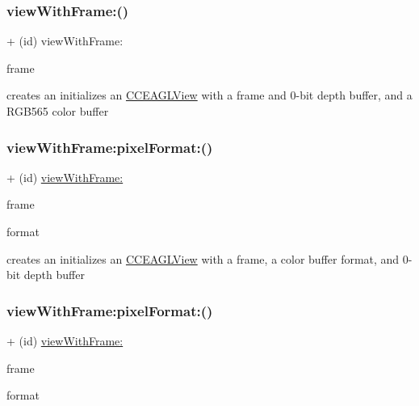 \subsubsection{\texorpdfstring{view\+With\+Frame\+:()}{viewWithFrame:()}\hspace{0.1cm}{\footnotesize\ttfamily [2/2]}}
{\footnotesize\ttfamily + (id) view\+With\+Frame\+: \begin{DoxyParamCaption}\item[{(C\+G\+Rect)}]{frame }\end{DoxyParamCaption}}

creates an initializes an \hyperlink{interfaceCCEAGLView}{C\+C\+E\+A\+G\+L\+View} with a frame and 0-\/bit depth buffer, and a R\+G\+B565 color buffer \mbox{\label{interfaceCCEAGLView_aa74a52bd30eed3aaaf133db0c302842a}} 
\subsubsection{\texorpdfstring{view\+With\+Frame\+:pixel\+Format\+:()}{viewWithFrame:pixelFormat:()}\hspace{0.1cm}{\footnotesize\ttfamily [1/2]}}
{\footnotesize\ttfamily + (id) \hyperlink{interfaceCCEAGLView_a288ea52be7dd891bbc9e0ee7e18cdf24}{view\+With\+Frame\+:} \begin{DoxyParamCaption}\item[{(C\+G\+Rect)}]{frame }\item[{pixelFormat:(N\+S\+String$\ast$)}]{format }\end{DoxyParamCaption}}

creates an initializes an \hyperlink{interfaceCCEAGLView}{C\+C\+E\+A\+G\+L\+View} with a frame, a color buffer format, and 0-\/bit depth buffer \mbox{\label{interfaceCCEAGLView_aa74a52bd30eed3aaaf133db0c302842a}} 
\subsubsection{\texorpdfstring{view\+With\+Frame\+:pixel\+Format\+:()}{viewWithFrame:pixelFormat:()}\hspace{0.1cm}{\footnotesize\ttfamily [2/2]}}
{\footnotesize\ttfamily + (id) \hyperlink{interfaceCCEAGLView_a288ea52be7dd891bbc9e0ee7e18cdf24}{view\+With\+Frame\+:} \begin{DoxyParamCaption}\item[{(C\+G\+Rect)}]{frame }\item[{pixelFormat:(N\+S\+String $\ast$)}]{format }\end{DoxyParamCaption}}

